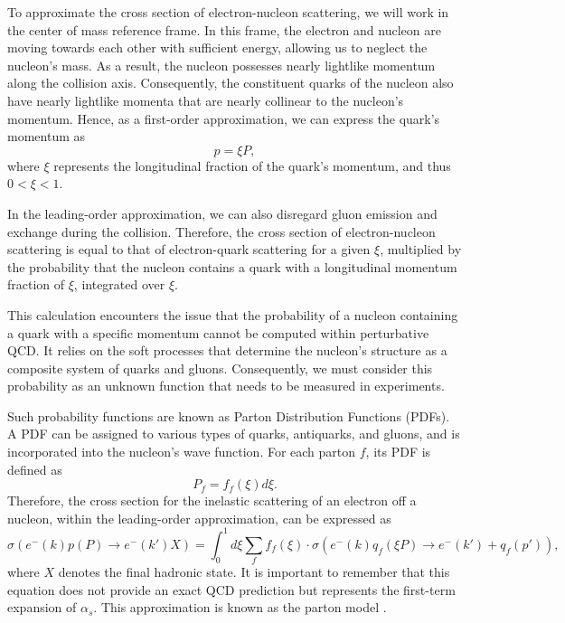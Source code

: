 To approximate the cross section of electron-nucleon scattering, we will work in the center of mass reference frame.
In this frame, the electron and nucleon are moving towards each other with sufficient energy, allowing us to neglect the nucleon's mass.
As a result, the nucleon possesses nearly lightlike momentum along the collision axis.
Consequently, the constituent quarks of the nucleon also have nearly lightlike momenta that are nearly collinear to the nucleon's momentum.
Hence, as a first-order approximation, we can express the quark's momentum as
\begin{equation*}
    p = \xi P,
\end{equation*}
where $\xi$ represents the longitudinal fraction of the quark's momentum, and thus $0 < \xi < 1$.

In the leading-order approximation, we can also disregard gluon emission and exchange during the collision.
Therefore, the cross section of electron-nucleon scattering is equal to that of electron-quark scattering for a given $\xi$, multiplied by the probability that the nucleon contains a quark with a longitudinal momentum fraction of $\xi$, integrated over $\xi$.

This calculation encounters the issue that the probability of a nucleon containing a quark with a specific momentum cannot be computed within perturbative QCD.
It relies on the soft processes that determine the nucleon's structure as a composite system of quarks and gluons.
Consequently, we must consider this probability as an unknown function that needs to be measured in experiments.

Such probability functions are known as Parton Distribution Functions (PDFs).
A PDF can be assigned to various types of quarks, antiquarks, and gluons, and is incorporated into the nucleon's wave function.
For each parton $f$, its PDF is defined as
\begin{equation*}
    P_f = f_f(\xi)d\xi.
\end{equation*}
Therefore, the cross section for the inelastic scattering of an electron off a nucleon, within the leading-order approximation, can be expressed as
\begin{equation*}
    \sigma\left( e^-(k) p(P) \rightarrow e^-(k') X \right) =
            \int_0^1d\xi \sum_f f_f(\xi) \cdot
            \sigma\left( e^-(k) q_f(\xi P) \rightarrow e^-(k') + q_f(p') \right),
\end{equation*}
where $X$ denotes the final hadronic state.
It is important to remember that this equation does not provide an exact QCD prediction but represents the first-term expansion of $\alpha_s$.
This approximation is known as the parton model \cite{halzen1991}.
